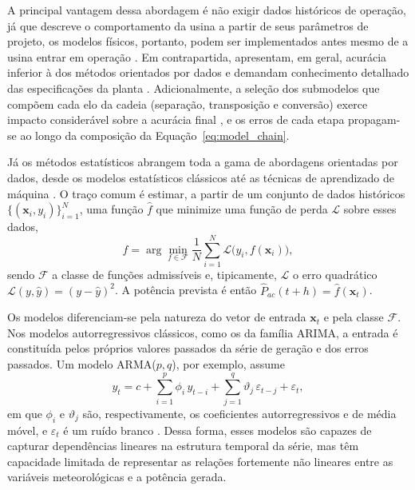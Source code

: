 A principal vantagem dessa abordagem é não exigir dados históricos de operação, já que
descreve o comportamento da usina a partir de seus parâmetros de projeto, os modelos
físicos, portanto, podem ser implementados antes mesmo de a usina entrar em operação
\cite{Andrade2023}. Em contrapartida, apresentam, em geral, acurácia inferior à dos métodos
orientados por dados e demandam conhecimento detalhado das especificações da planta
\cite{Markovics2022,Andrade2023}. Adicionalmente, a seleção dos submodelos que compõem cada
elo da cadeia (separação, transposição e conversão) exerce impacto considerável sobre a
acurácia final \cite{Markovics2022}, e os erros de cada etapa propagam-se ao longo da
composição da Equação~\eqref{eq:model_chain}.

Já os métodos estatísticos abrangem toda a gama de abordagens orientadas por dados, desde os
modelos estatísticos clássicos até as técnicas de aprendizado de máquina
\cite{Markovics2022}. O traço comum é estimar, a partir de um conjunto de dados históricos
$\{(\mathbf{x}_{i}, y_{i})\}_{i=1}^{N}$, uma função $\hat{f}$ que minimize uma função de
perda $\mathcal{L}$ sobre esses dados,
\begin{equation}
    \hat{f} = \arg\min_{f \in \mathcal{F}} \frac{1}{N}\sum_{i=1}^{N}
    \mathcal{L}\big(y_{i}, f(\mathbf{x}_{i})\big),
    \label{eq:erm}
\end{equation}
sendo $\mathcal{F}$ a classe de funções admissíveis e, tipicamente, $\mathcal{L}$ o erro
quadrático $\mathcal{L}(y,\hat{y}) = (y-\hat{y})^{2}$. A potência prevista é então
$\hat{P}_{ac}(t+h) = \hat{f}(\mathbf{x}_{t})$.

Os modelos diferenciam-se pela natureza do vetor de entrada $\mathbf{x}_{t}$ e pela classe
$\mathcal{F}$. Nos modelos autorregressivos clássicos, como os da família ARIMA, a
entrada é constituída pelos próprios valores passados da série de geração e dos erros
passados. Um modelo ARMA($p,q$), por exemplo, assume
\begin{equation}
    y_{t} = c + \sum_{i=1}^{p}\phi_{i}\,y_{t-i}
    + \sum_{j=1}^{q}\vartheta_{j}\,\varepsilon_{t-j} + \varepsilon_{t},
    \label{eq:arma}
\end{equation}
em que $\phi_{i}$ e $\vartheta_{j}$ são, respectivamente, os coeficientes autorregressivos
e de média móvel, e $\varepsilon_{t}$ é um ruído branco \cite{Andrade2023}. Dessa forma, esses modelos
são capazes de capturar dependências lineares na estrutura temporal da série, mas têm capacidade limitada
de representar as relações fortemente não lineares entre as variáveis meteorológicas e a
potência gerada.

